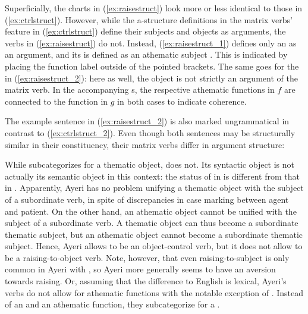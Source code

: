 Superficially, the charts in (\ref{ex:raisestruct}) look more or less identical
to those in (\ref{ex:ctrlstruct}). However, while the a-structure definitions
in the matrix verbs' \Pred{} feature in (\ref{ex:ctrlstruct}) define their
subjects and objects as arguments, the verbs in (\ref{ex:raisestruct}) do not.
Instead, (\ref{ex:raisestruct_1}) defines only an \XCompl{} as an argument, and
its \Subj{} is defined as an athematic subject \citep[304--308]{bresnan2016}.
This is indicated by placing the function label outside of the pointed
brackets. The same goes for the \Obj{} in (\ref{ex:raisestruct_2}): here as
well, the object is not strictly an argument of the matrix verb. In the
accompanying \Avm{}s, the respective athematic functions in $f$ are connected
to the \Subj{} function in $g$ in both cases to indicate coherence.

The example sentence in (\ref{ex:raisestruct_2}) is also marked ungrammatical
in contrast to (\ref{ex:ctrlstruct_2}). Even though both sentences may be
structurally similar in their constituency, their matrix verbs differ in
argument structure:

\pex\label{ex:ctrlraisecomp}
\a\label{ex:ctrlraisecomp_octrl}%

\a\label{ex:ctrlraisecomp_raiseo}%
\xe

While  subcategorizes for a thematic object,  does not.
Its syntactic object is not actually its semantic object in this context: the
status of  in  is different from that in
. Apparently, Ayeri has no problem unifying
a thematic object with the subject of a subordinate verb, in spite of
discrepancies in case marking between agent and patient. On the other hand, an
athematic object cannot be unified with the subject of a subordinate verb. A
thematic object can thus become a subordinate thematic subject, but an
athematic object cannot become a subordinate thematic subject. Hence, Ayeri
allows  to be an object-control verb, but it does not
allow  to be a raising-to-object verb. Note,
however, that even raising-to-subject is only common in Ayeri with
, so Ayeri more generally seems to have an aversion
towards raising. Or, assuming that the difference to English is lexical,
Ayeri's verbs do not allow for athematic functions with the notable exception
of . Instead of an \XCompl{} and an athematic function,
they subcategorize for a \Compl{}.


